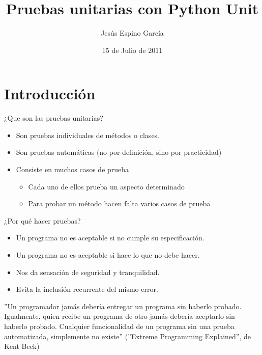 \documentclass[10pt]{beamer}
\title{Pruebas unitarias con Python Unit}
\author{Jesús Espino García}
\date{15 de Julio de 2011}
\institute[Python Madrid 2011]{Kaleidos\\Python Madrid 2011}
\begin{document}
  \frame{\maketitle}


  \section*{Introducción}
  \begin{frame}{¿Que son las pruebas unitarias?}
    \begin{itemize}
      \item Son pruebas individuales de métodos o clases.
      \item Son pruebas automáticas (no por definición, sino por practicidad)
      \item Consiste en muchos casos de prueba
      \begin{itemize}
        \item Cada uno de ellos prueba un aspecto determinado
        \item Para probar un método hacen falta varios casos de prueba
      \end{itemize}
    \end{itemize}
  \end{frame}
  
  \begin{frame}{¿Por qué hacer pruebas?}
    \begin{itemize}
      \item Un programa no es aceptable si no cumple su especificación.
      \item Un programa no es aceptable si hace lo que no debe hacer.
      \item Nos da sensación de seguridad y tranquilidad.
      \item Evita la inclusión recurrente del mismo error.
    \end{itemize}

    ''Un programador jamás debería entregar un programa sin haberlo probado. Igualmente, quien recibe un programa de otro jamás debería aceptarlo sin haberlo probado. Cualquier funcionalidad de un programa sin una prueba automatizada, simplemente no existe'' (''Extreme Programming Explained'', de Kent Beck)
  \end{frame}
  
\end{document}
